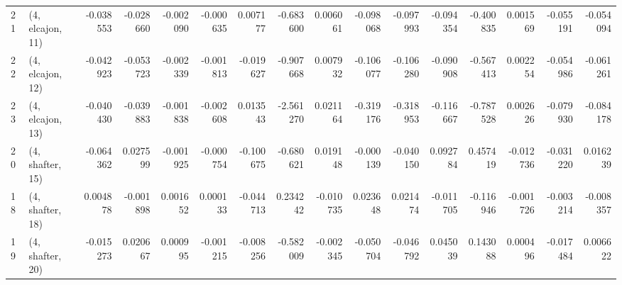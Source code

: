 \begin{tabular}{llrrrrrrrrrrrrrr}
21 &  (4, elcajon, 11) & -0.038553 & -0.028660 &  -0.002090 & -0.000635 &  0.007177 &  -0.683600 &  0.006061 &  -0.098068 & -0.097993 & -0.094354 &  -0.400835 &  0.001569 & -0.055191 & -0.054094 \\
22 &  (4, elcajon, 12) & -0.042923 & -0.053723 &  -0.002339 & -0.001813 & -0.019627 &  -0.907668 &  0.007932 &  -0.106077 & -0.106280 & -0.090908 &  -0.567413 &  0.002254 & -0.054986 & -0.061261 \\
23 &  (4, elcajon, 13) & -0.040430 & -0.039883 &  -0.001838 & -0.002608 &  0.013543 &  -2.561270 &  0.021164 &  -0.319176 & -0.318953 & -0.116667 &  -0.787528 &  0.002626 & -0.079930 & -0.084178 \\
20 &  (4, shafter, 15) & -0.064362 &  0.027599 &  -0.001925 & -0.000754 & -0.100675 &  -0.680621 &  0.019148 &  -0.000139 & -0.040150 &  0.092784 &   0.457419 & -0.012736 & -0.031220 &  0.016239 \\
18 &  (4, shafter, 18) &  0.004878 & -0.001898 &   0.001652 &  0.000133 & -0.044713 &   0.234242 & -0.010735 &   0.023648 &  0.021474 & -0.011705 &  -0.116946 & -0.001726 & -0.003214 & -0.008357 \\
19 &  (4, shafter, 20) & -0.015273 &  0.020667 &   0.000995 & -0.001215 & -0.008256 &  -0.582009 & -0.002345 &  -0.050704 & -0.046792 &  0.045039 &   0.143088 &  0.000496 & -0.017484 &  0.006622 \\
\bottomrule
\end{tabular}
